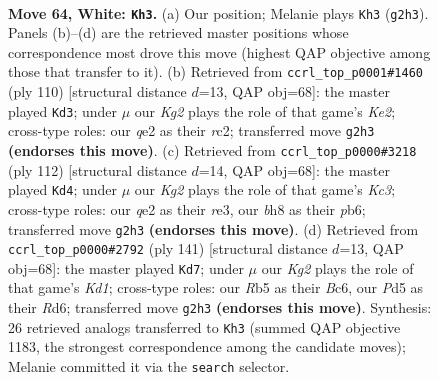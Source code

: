 \documentclass[11pt]{article}
\begin{document}
\clearpage

\begin{figure}[p]\centering
\begin{subfigure}{0.46\textwidth}\centering
\resizebox{\linewidth}{!}{%
\newchessgame
\chessboard[
  setfen={5k1b/5p2/8/1R1P4/8/8/4q1K1/8 w - - 5 64},
  showmover=false,
  pgfstyle=straightmove, color=movearrow, markmove={g2-h3}
]}
\caption{}
\end{subfigure}\hfill
\begin{subfigure}{0.46\textwidth}\centering
\resizebox{\linewidth}{!}{%
\newchessgame
\chessboard[
  setfen={8/8/P5k1/7p/8/8/2r1K3/R7 w - - 7 56},
  showmover=false,
  pgfstyle=straightmove, color=movearrow, markmove={e2-d3}
]}
\caption{}
\end{subfigure}
\\[4pt]
\begin{subfigure}{0.46\textwidth}\centering
\resizebox{\linewidth}{!}{%
\newchessgame
\chessboard[
  setfen={8/5R2/1p1k4/3p4/5P2/2K1r3/8/8 w - - 0 57},
  showmover=false,
  pgfstyle=straightmove, color=movearrow, markmove={c3-d4}
]}
\caption{}
\end{subfigure}\hfill
\begin{subfigure}{0.46\textwidth}\centering
\resizebox{\linewidth}{!}{%
\newchessgame
\chessboard[
  setfen={3k1Q2/8/2br4/8/6P1/6K1/8/8 b - - 10 71},
  showmover=false,
  pgfstyle=straightmove, color=movearrow, markmove={d8-d7}
]}
\caption{}
\end{subfigure}
\caption{\textbf{Move 64, White: \texttt{Kh3}.} (a) Our position; Melanie plays \texttt{Kh3} (\texttt{g2h3}). Panels (b)--(d) are the retrieved master positions whose correspondence most drove this move (highest QAP objective among those that transfer to it). (b) Retrieved from \texttt{ccrl\_top\_p0001\#1460} (ply 110) [structural distance $d$=13, QAP obj=68]: the master played \texttt{Kd3}; under $\mu$ our \emph{Kg2} plays the role of that game's \emph{Ke2}; cross-type roles: our \emph{q}e2 as their \emph{r}c2; transferred move \texttt{g2h3} \textbf{(endorses this move)}. (c) Retrieved from \texttt{ccrl\_top\_p0000\#3218} (ply 112) [structural distance $d$=14, QAP obj=68]: the master played \texttt{Kd4}; under $\mu$ our \emph{Kg2} plays the role of that game's \emph{Kc3}; cross-type roles: our \emph{q}e2 as their \emph{r}e3, our \emph{b}h8 as their \emph{p}b6; transferred move \texttt{g2h3} \textbf{(endorses this move)}. (d) Retrieved from \texttt{ccrl\_top\_p0000\#2792} (ply 141) [structural distance $d$=13, QAP obj=68]: the master played \texttt{Kd7}; under $\mu$ our \emph{Kg2} plays the role of that game's \emph{Kd1}; cross-type roles: our \emph{R}b5 as their \emph{B}c6, our \emph{P}d5 as their \emph{R}d6; transferred move \texttt{g2h3} \textbf{(endorses this move)}. Synthesis: 26 retrieved analogs transferred to \texttt{Kh3} (summed QAP objective 1183, the strongest correspondence among the candidate moves); Melanie committed it via the \texttt{search} selector.}
\label{fig:thought-m126}
\end{figure}
\end{document}
